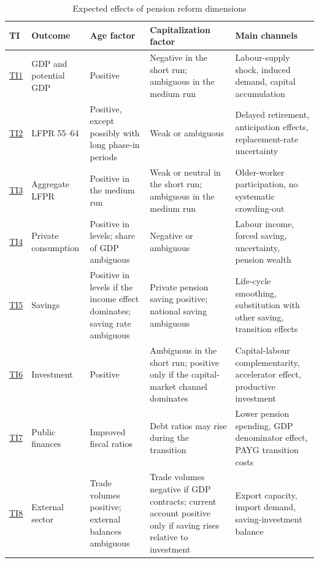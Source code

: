 \documentclass[11pt,english,a4paper, twoside, authoryear]{article}
\begin{document}
\begin{table}[H]
\centering
\begin{singlespace}
\scriptsize
\caption{Expected effects of pension reform dimensions}
\label{tab:expected_effects}
\setlength{\tabcolsep}{4pt}
\renewcommand{\arraystretch}{1.25}
\begin{tabularx}{\textwidth}{p{1.1cm}p{3.2cm}p{2.7cm}p{3.2cm}X}
\toprule
TI & Outcome & Age factor & Capitalization factor & Main channels \\
\midrule

\hyperref[test:gdp]{TI1} 
& GDP and potential GDP
& Positive
& Negative in the short run; ambiguous in the medium run
& Labour-supply shock, induced demand, capital accumulation \\

\hyperref[test:emp_old]{TI2} 
& LFPR 55--64
& Positive, except possibly with long phase-in periods
& Weak or ambiguous
& Delayed retirement, anticipation effects, replacement-rate uncertainty \\

\hyperref[test:emp_agg]{TI3} 
& Aggregate LFPR
& Positive in the medium run
& Weak or neutral in the short run; ambiguous in the medium run
& Older-worker participation, no systematic crowding-out \\

\hyperref[test:conso]{TI4} 
& Private consumption
& Positive in levels; share of GDP ambiguous
& Negative or ambiguous
& Labour income, forced saving, uncertainty, pension wealth \\

\hyperref[test:sav]{TI5} 
& Savings
& Positive in levels if the income effect dominates; saving rate ambiguous
& Private pension saving positive; national saving ambiguous
& Life-cycle smoothing, substitution with other saving, transition effects \\

\hyperref[test:inv]{TI6} 
& Investment
& Positive
& Ambiguous in the short run; positive only if the capital-market channel dominates
& Capital-labour complementarity, accelerator effect, productive investment \\

\hyperref[test:public_finances]{TI7} 
& Public finances
& Improved fiscal ratios
& Debt ratios may rise during the transition
& Lower pension spending, GDP denominator effect, PAYG transition costs \\

\hyperref[test:external]{TI8} 
& External sector
& Trade volumes positive; external balances ambiguous
& Trade volumes negative if GDP contracts; current account positive only if saving rises relative to investment
& Export capacity, import demand, saving-investment balance \\


\end{tabularx}
\end{singlespace}
\end{table}
\end{document}
